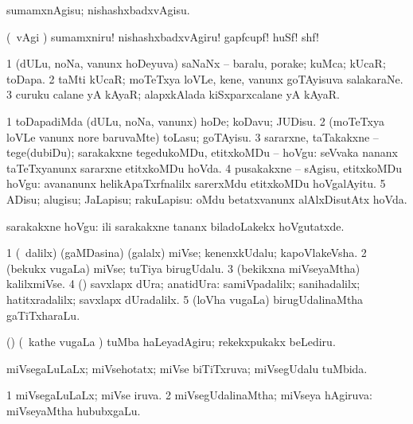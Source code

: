 \noindent
\gl{\sakirx}
\expl{}
\bmng
sumamxnAgisu; nishashxbadxvAgisu. 
\emng

\noindent 
\gl{\akirx}
\expl{}
\bmng
(\kanmu\ \BAavayx vAgi \parx) sumamxniru! nishashxbadxvAgiru! gapfcupf! huSf! shf! 
\emng
\eentry

\bentry
{} 
\gl{\nA}
\expl{}
\bmng
\bnum
\num{1} (dULu, noNa, \mo vanunx hoDeyuva) saNaNx -- baralu, porake; kuMca; kUcaR; toDapa. 
\num{2} taMti kUcaR; moTeTxya loVLe, kene, \mo vanunx goTAyisuva salakaraNe. 
\num{3} curuku calane yA kAyaR; alapxkAlada kiSxparxcalane yA kAyaR. 
\enum
\emng
\eentry

\bentry
{} 
\gl{\sakirx}
\expl{}
\bmng
\bnum
\num{1} toDapadiMda (dULu, noNa, \mo vanunx) hoDe; koDavu; JUDisu. 
\num{2} (moTeTxya loVLe \mo vanunx nore baruvaMte) toLasu; goTAyisu. 
\num{3} sararxne, taTakakxne -- tege(dubiDu); sarakakxne tegedukoMDu, etitxkoMDu -- hoVgu:  seVvaka nananx taTeTxyanunx sararxne etitxkoMDu hoVda. 
\num{4} pusakakxne -- sAgisu, etitxkoMDu hoVgu:  avananunx helikApaTxrfnalilx sarerxMdu etitxkoMDu hoVgalAyitu. 
\num{5} ADisu; alugisu; JaLapisu; rakuLapisu:  oMdu betatxvanunx alAlxDisutAtx hoVda. 
\enum
\emng

\noindent
\gl{\akirx}
\expl{}
\bmng
sarakakxne hoVgu:  ili sarakakxne tananx biladoLakekx hoVgutatxde. 
\emng
\eentry

\bentry
{} 
\gl{\nA}
\expl{}
\bmng
\bnum
\num{1} (\sA\ \bava dalilx) (gaMDasina) (galalx) miVse; kenenxkUdalu; kapoVlakeVsha. 
\num{2} (bekukx \mo vugaLa) miVse; tuTiya birugUdalu. 
\num{3} (bekikxna miVseyaMtha) kalilxmiVse. 
\num{4} (\AmA) savxlapx dUra; anatidUra:  samiVpadalilx; sanihadalilx; hatitxradalilx; savxlapx dUradalilx. 
\num{5} (loVha \mo vugaLa) birugUdalinaMtha gaTiTxharaLu. 
\enum
\emng

\noindent
\gl{\pagu}
\expl{}
\bmng
{} (\AmA) (\kanmu\ kathe \mo vugaLa \vi) tuMba haLeyadAgiru; rekekxpukakx beLediru. 
\emng
\eentry

\bentry
{} 
\gl{\gu}
\expl{}
\bmng
miVsegaLuLaLx; miVsehotatx; miVse biTiTxruva; miVsegUdalu tuMbida. 
\emng
\eentry

\bentry
{} 
\gl{\gu}
\expl{}
\bmng
\bnum
\num{1} miVsegaLuLaLx; miVse iruva. 
\num{2} miVsegUdalinaMtha; miVseya hAgiruva:  miVseyaMtha hububxgaLu. 
\enum
\emng
\eentry

